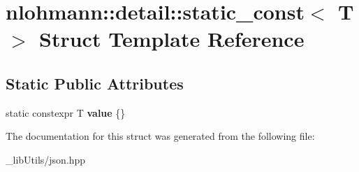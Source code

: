 \hypertarget{structnlohmann_1_1detail_1_1static__const}{}\section{nlohmann\+:\+:detail\+:\+:static\+\_\+const$<$ T $>$ Struct Template Reference}
\label{structnlohmann_1_1detail_1_1static__const}
\subsection*{Static Public Attributes}
\begin{DoxyCompactItemize}
\item 
static constexpr T {\bfseries value} \{\}\hypertarget{structnlohmann_1_1detail_1_1static__const_a6bb7ab2ddd6abc41fb4ffb7c6dfa237e}{}\label{structnlohmann_1_1detail_1_1static__const_a6bb7ab2ddd6abc41fb4ffb7c6dfa237e}

\end{DoxyCompactItemize}


The documentation for this struct was generated from the following file\+:\begin{DoxyCompactItemize}
\item 
\+\_\+lib\+Utils/json.\+hpp\end{DoxyCompactItemize}
